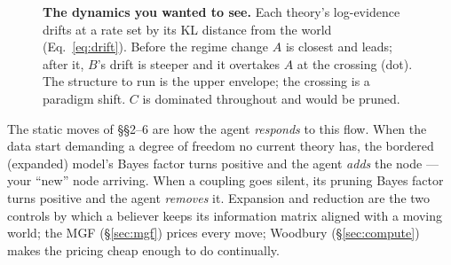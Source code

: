 \documentclass[11pt]{article}
\newcommand{\Z}{\mathcal{Z}}        %
\theoremstyle{definition}
\begin{document}
\begin{figure}[ht]
\centering
{}
\caption{\textbf{The dynamics you wanted to see.} Each theory's
log-evidence drifts at a rate set by its KL distance from the world
(Eq.~\ref{eq:drift}). Before the regime change $A$ is closest and leads;
after it, $B$'s drift is steeper and it overtakes $A$ at the crossing
(dot). The structure to run is the upper envelope; the crossing is a
paradigm shift. $C$ is dominated throughout and would be pruned.}
\label{fig:dynamics}
\end{figure}

The static moves of \S\S2--6 are how the agent \emph{responds} to this
flow. When the data start demanding a degree of freedom no current theory
has, the bordered (expanded) model's Bayes factor turns positive and the
agent \emph{adds} the node --- your ``new'' node arriving. When a coupling
goes silent, its pruning Bayes factor turns positive and the agent
\emph{removes} it. Expansion and reduction are the two controls by which a
believer keeps its information matrix aligned with a moving world; the
MGF (\S\ref{sec:mgf}) prices every move; Woodbury (\S\ref{sec:compute})
makes the pricing cheap enough to do continually.
\end{document}
